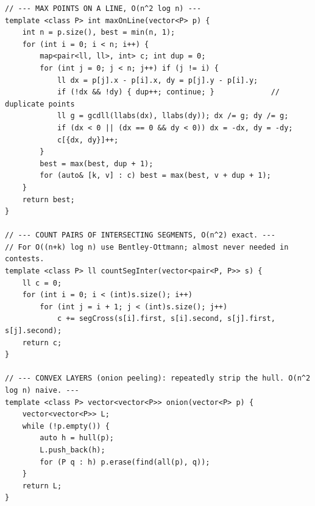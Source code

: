 \documentclass[9pt,a4paper,twocolumn]{extarticle}
\begin{document}
\begin{lstlisting}
// --- MAX POINTS ON A LINE, O(n^2 log n) ---
template <class P> int maxOnLine(vector<P> p) {
    int n = p.size(), best = min(n, 1);
    for (int i = 0; i < n; i++) {
        map<pair<ll, ll>, int> c; int dup = 0;
        for (int j = 0; j < n; j++) if (j != i) {
            ll dx = p[j].x - p[i].x, dy = p[j].y - p[i].y;
            if (!dx && !dy) { dup++; continue; }             // duplicate points
            ll g = gcdll(llabs(dx), llabs(dy)); dx /= g; dy /= g;
            if (dx < 0 || (dx == 0 && dy < 0)) dx = -dx, dy = -dy;
            c[{dx, dy}]++;
        }
        best = max(best, dup + 1);
        for (auto& [k, v] : c) best = max(best, v + dup + 1);
    }
    return best;
}

// --- COUNT PAIRS OF INTERSECTING SEGMENTS, O(n^2) exact. ---
// For O((n+k) log n) use Bentley-Ottmann; almost never needed in contests.
template <class P> ll countSegInter(vector<pair<P, P>> s) {
    ll c = 0;
    for (int i = 0; i < (int)s.size(); i++)
        for (int j = i + 1; j < (int)s.size(); j++)
            c += segCross(s[i].first, s[i].second, s[j].first, s[j].second);
    return c;
}

// --- CONVEX LAYERS (onion peeling): repeatedly strip the hull. O(n^2 log n) naive. ---
template <class P> vector<vector<P>> onion(vector<P> p) {
    vector<vector<P>> L;
    while (!p.empty()) {
        auto h = hull(p);
        L.push_back(h);
        for (P q : h) p.erase(find(all(p), q));
    }
    return L;
}
\end{lstlisting}

\filbreak
\end{document}
